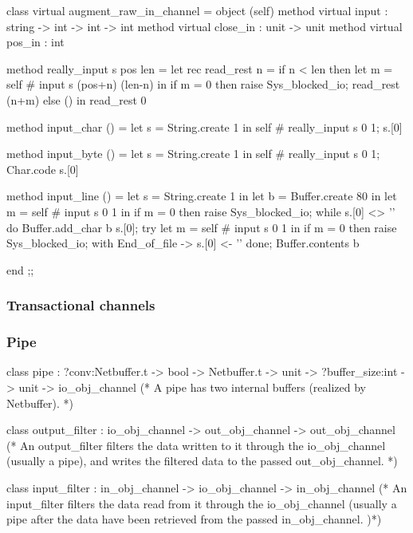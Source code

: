 \begin{ocamlcode}
class virtual augment_raw_in_channel =
object (self)
  method virtual input : string -> int -> int -> int
  method virtual close_in : unit -> unit
  method virtual pos_in : int

  method really_input s pos len =
    let rec read_rest n =
      if n < len then
	let m = self # input s (pos+n) (len-n) in
	if m = 0 then raise Sys_blocked_io;
	read_rest (n+m)
      else
	()
    in
    read_rest 0

  method input_char () =
    let s = String.create 1 in
    self # really_input s 0 1;
    s.[0]

  method input_byte () =
    let s = String.create 1 in
    self # really_input s 0 1;
    Char.code s.[0]

  method input_line () =
    let s = String.create 1 in
    let b = Buffer.create 80 in
    let m = self # input s 0 1 in
    if m = 0 then raise Sys_blocked_io;
    while s.[0] <> '\n' do
      Buffer.add_char b s.[0];
      try
	let m = self # input s 0 1 in
	if m = 0 then raise Sys_blocked_io;
      with
	  End_of_file ->
	    s.[0] <- '\n'
    done;
    Buffer.contents b

end
;;  
\end{ocamlcode}

\subsubsection{Transactional channels}

\subsubsection{Pipe}

\begin{ocamlcode}
  class pipe :
  ?conv:Netbuffer.t -> bool -> Netbuffer.t -> unit
  -> ?buffer_size:int -> unit -> io_obj_channel
  (* A pipe has two internal buffers (realized by Netbuffer). *)

  class output_filter :
  io_obj_channel -> out_obj_channel -> out_obj_channel
  (* An output_filter filters the data written to it
  through the io_obj_channel (usually a pipe), and writes
  the filtered data to the passed out_obj_channel. *)

  class input_filter : in_obj_channel -> io_obj_channel
  -> in_obj_channel
  (* An input_filter filters the data read from it
  through the io_obj_channel (usually a pipe after
  the data have been retrieved from the passed
  in_obj_channel. )*)
\end{ocamlcode}

